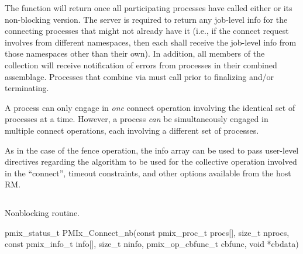 The function will return once all participating processes have called either  or its non-blocking version.
The server is required to return any job-level info for the connecting processes that might not already have it (i.e., if the connect request involves  from different namespaces, then each  shall receive the job-level info from those namespaces other than their own). In addition, all members of the collection will receive notification of errors from processes in their combined assemblage. Processes that combine via  must call  prior to finalizing and/or terminating.

A process can only engage in \emph{one} connect operation involving the identical set of processes at a time.
However, a process \emph{can} be simultaneously engaged in multiple connect operations, each involving a different set of processes.

As in the case of the fence operation, the info array can be used to pass user-level directives regarding the algorithm to be used for the collective operation involved in the ``connect'', timeout constraints, and other options available from the host \ac{RM}.


\subsection{}

\summary

Nonblocking  routine.

\format

\cspecificstart
\begin{codepar}
pmix_status_t
PMIx_Connect_nb(const pmix_proc_t procs[], size_t nprocs,
                const pmix_info_t info[], size_t ninfo,
                pmix_op_cbfunc_t cbfunc, void *cbdata)
\end{codepar}
\cspecificend

\begin{arglist}
\end{arglist}

